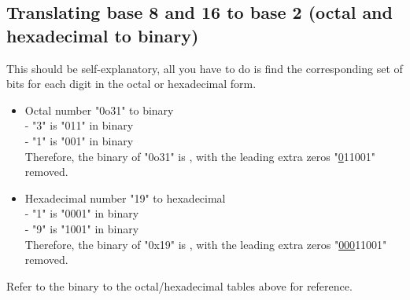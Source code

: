 \documentclass{article}
\begin{document}
\subsection{Translating base 8 and 16 to base 2 (octal and hexadecimal to binary)}
This should be self-explanatory, all you have to do is find the corresponding set of bits for each digit in the octal or hexadecimal form.

\begin{itemize}
    \item Octal number "0o31" to binary \\
    - "3" is "011" in binary \\
    - "1" is "001" in binary \\
    Therefore, the binary of "0o31" is , with the leading extra zeros "\underline{0}11001" removed.
    \item Hexadecimal number "19" to hexadecimal \\
    - "1" is "0001" in binary \\
    - "9" is "1001" in binary \\
    Therefore, the binary of "0x19" is , with the leading extra zeros "\underline{000}11001" removed.
\end{itemize}

\begin{center}
    Refer to the binary to the octal/hexadecimal tables above for reference.
\end{center}
\end{document}

